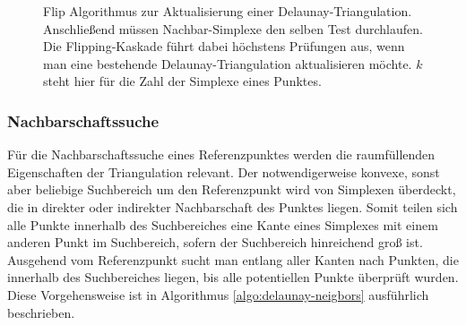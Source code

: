 \begin{figure}[bhpt]
  \caption{
    Flip Algorithmus zur Aktualisierung einer Delaunay-Triangulation.
    Anschließend müssen Nachbar-Simplexe den selben Test durchlaufen.
    Die Flipping-Kaskade führt dabei höchstens  Prüfungen aus, wenn man eine bestehende Delaunay-Triangulation aktualisieren möchte.
    $k$ steht hier für die Zahl der Simplexe eines Punktes.
}
  \label{fig:delaunay-flip}
\end{figure}

\subsubsection{Nachbarschaftssuche}
Für die Nachbarschaftssuche eines Referenzpunktes werden die raumfüllenden Eigenschaften der Triangulation relevant.
Der notwendigerweise konvexe, sonst aber beliebige Suchbereich um den Referenzpunkt wird von Simplexen überdeckt, die in direkter oder indirekter Nachbarschaft des Punktes liegen.
Somit teilen sich alle Punkte innerhalb des Suchbereiches eine Kante eines Simplexes mit einem anderen Punkt im Suchbereich, sofern der Suchbereich hinreichend groß ist.
Ausgehend vom Referenzpunkt sucht man entlang aller Kanten nach Punkten, die innerhalb des Suchbereiches liegen, bis alle potentiellen Punkte überprüft wurden.
Diese Vorgehensweise ist in Algorithmus \ref{algo:delaunay-neigbors} ausführlich beschrieben.

